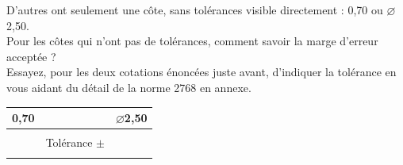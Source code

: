 \documentclass[
	11pt, %
	fleqn, %
	a4paper, %
]{LegrandOrangeBook}
\begin{document}
D'autres ont seulement une côte, sans tolérances visible directement : 0,70 ou $\varnothing$2,50.\\
Pour les côtes qui n'ont pas de tolérances, comment savoir la marge d'erreur acceptée ?\\

Essayez, pour les deux cotations énoncées juste avant, d'indiquer la tolérance en vous aidant du détail de la norme 2768 en annexe.


\begin{table}[H] %
	\centering %
	\begin{tabular}{L{0.15\textwidth} R{0.15\textwidth} R{0.15\textwidth}} %
		\toprule
		\textbf{0,70} & \textbf{} & \textbf{$\varnothing$2,50}\\
		\midrule
		  &  &  \\
		  & Tolérance $\pm$ &  \\
		  &  &  \\
		\bottomrule
	\end{tabular}
	\label{Tol} %
\end{table}
\end{document}

